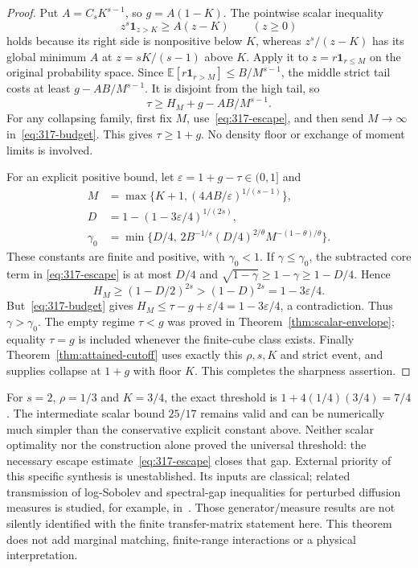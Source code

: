 \begin{proof}
Put $A=C_sK^{s-1}$, so $g=A(1-K)$. The pointwise scalar inequality
\[
 z^s\mathbf1_{z>K}\ge A(z-K)\qquad(z\ge0)
\]
holds because its right side is nonpositive below $K$, whereas
$z^s/(z-K)$ has its global minimum $A$ at $z=sK/(s-1)$ above $K$.
Apply it to $z=r\mathbf1_{r\le M}$ on the original probability space.
Since $\mathbb E[r\mathbf1_{r>M}]\le B/M^{s-1}$, the middle strict
tail costs at least $g-AB/M^{s-1}$. It is disjoint from the high tail,
so
\begin{equation}\label{eq:317-budget}
 \tau\ge H_M+g-AB/M^{s-1}.
\end{equation}
For any collapsing family, first fix $M$, use~\eqref{eq:317-escape},
and then send $M\to\infty$ in~\eqref{eq:317-budget}. This gives
$\tau\ge1+g$. No density floor or exchange of moment limits is involved.

For an explicit positive bound, let $\varepsilon=1+g-\tau\in(0,1]$ and
\begin{align*}
 M&=\max\{K+1,(4AB/\varepsilon)^{1/(s-1)}\},\\
 D&=1-(1-3\varepsilon/4)^{1/(2s)},\\
 \gamma_0&=\min\{D/4,\,
 2B^{-1/s}(D/4)^{2/\theta}M^{-(1-\theta)/\theta}\}.
\end{align*}
These constants are finite and positive, with $\gamma_0<1$.
If $\gamma\le\gamma_0$, the subtracted core term in
\eqref{eq:317-escape} is at most $D/4$ and
$\sqrt{1-\gamma}\ge1-\gamma\ge1-D/4$. Hence
\[
 H_M\ge(1-D/2)^{2s}>(1-D)^{2s}=1-3\varepsilon/4.
\]
But~\eqref{eq:317-budget} gives
$H_M\le\tau-g+\varepsilon/4=1-3\varepsilon/4$, a contradiction.
Thus $\gamma>\gamma_0$. The empty regime $\tau<g$ was proved in
Theorem~\ref{thm:scalar-envelope}; equality $\tau=g$ is included whenever
the finite-cube class exists. Finally Theorem~\ref{thm:attained-cutoff}
uses exactly this $\rho,s,K$ and strict event, and supplies collapse at
$1+g$ with floor $K$. This completes the sharpness assertion.
\end{proof}

For $s=2$, $\rho=1/3$ and $K=3/4$, the exact threshold is
$1+4(1/4)(3/4)=7/4$. The intermediate scalar bound $25/17$ remains
valid and can be numerically much simpler than the conservative explicit
constant above. Neither scalar optimality nor the construction alone
proved the universal threshold: the necessary escape
estimate~\eqref{eq:317-escape} closes that gap. External priority of this
specific synthesis is unestablished. Its inputs are classical; related
transmission of log-Sobolev and spectral-gap inequalities for perturbed
diffusion measures is studied, for example, in~\cite{Cattiaux}.
Those generator/measure results are not silently identified with the
finite transfer-matrix statement here. This theorem does not add marginal
matching, finite-range interactions or a physical interpretation.

